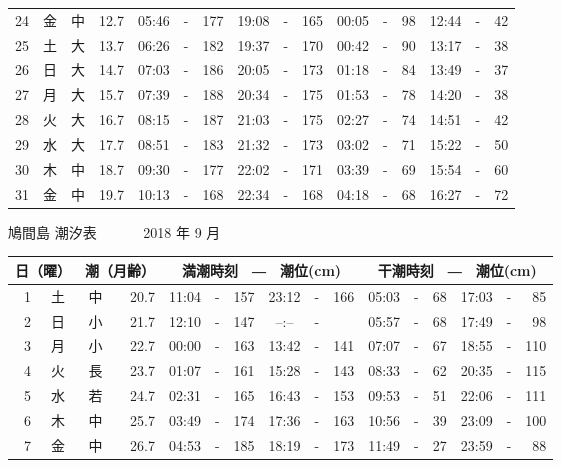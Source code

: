 \documentclass[12pt.a4j]{jsarticle}
\begin{document}
\begin{center}
\begin{table}[ht]
\begin{tabular}{|rc|cr|ccrccr|ccrccr|}
24 & 金 & 中 & 12.7 &  05:46 &-& 177  &  19:08 &-& 165  &   00:05 &-&  98  &   12:44 &-&  42  \\
25 & 土 & 大 & 13.7 &  06:26 &-& 182  &  19:37 &-& 170  &   00:42 &-&  90  &   13:17 &-&  38  \\
26 & 日 & 大 & 14.7 &  07:03 &-& 186  &  20:05 &-& 173  &   01:18 &-&  84  &   13:49 &-&  37  \\
27 & 月 & 大 & 15.7 &  07:39 &-& 188  &  20:34 &-& 175  &   01:53 &-&  78  &   14:20 &-&  38  \\
28 & 火 & 大 & 16.7 &  08:15 &-& 187  &  21:03 &-& 175  &   02:27 &-&  74  &   14:51 &-&  42  \\
29 & 水 & 大 & 17.7 &  08:51 &-& 183  &  21:32 &-& 173  &   03:02 &-&  71  &   15:22 &-&  50  \\
30 & 木 & 中 & 18.7 &  09:30 &-& 177  &  22:02 &-& 171  &   03:39 &-&  69  &   15:54 &-&  60  \\
31 & 金 & 中 & 19.7 &  10:13 &-& 168  &  22:34 &-& 168  &   04:18 &-&  68  &   16:27 &-&  72  \\
   \hline
   \end{tabular}
\end{table}
\newpage
 {\LARGE 鳩間島  潮汐表　　　}
 {\large 2018 年  9 月}\\
 \begin{table}[ht]
    \begin{tabular}{|rc|cr|ccrccr|ccrccr|}
    \hline
    \multicolumn{2}{|c|}{日（曜）} & \multicolumn{2}{c|}{潮（月齢）} & \multicolumn{6}{c|}{満潮時刻　―　潮位(cm)} & \multicolumn{6}{c|}{干潮時刻　―　潮位(cm)} \\
 \hline
 1 & 土 & 中 & 20.7 &  11:04 &-& 157  &  23:12 &-& 166  &   05:03 &-&  68  &   17:03 &-&  85  \\
 2 & 日 & 小 & 21.7 &  12:10 &-& 147  &  --:-- &-&     &   05:57 &-&  68  &   17:49 &-&  98  \\
 3 & 月 & 小 & 22.7 &  00:00 &-& 163  &  13:42 &-& 141  &   07:07 &-&  67  &   18:55 &-& 110  \\
 4 & 火 & 長 & 23.7 &  01:07 &-& 161  &  15:28 &-& 143  &   08:33 &-&  62  &   20:35 &-& 115  \\
 5 & 水 & 若 & 24.7 &  02:31 &-& 165  &  16:43 &-& 153  &   09:53 &-&  51  &   22:06 &-& 111  \\
 6 & 木 & 中 & 25.7 &  03:49 &-& 174  &  17:36 &-& 163  &   10:56 &-&  39  &   23:09 &-& 100  \\
 7 & 金 & 中 & 26.7 &  04:53 &-& 185  &  18:19 &-& 173  &   11:49 &-&  27  &   23:59 &-&  88  \\

\end{tabular}
\end{table}
\end{center}
\end{document}
